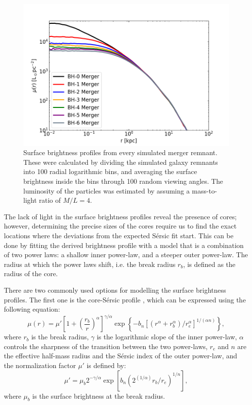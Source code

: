 \documentclass[english, oneside]{HYgradu}
\begin{document}
\begin{figure}[h]
	\centering
	\includegraphics[width=\textwidth]{SurfaceBrightnessProfiles.png}
	\caption{Surface brightness profiles from every simulated merger remnant. These were calculated by dividing the simulated galaxy remnants into 100 radial logarithmic bins, and averaging the surface brightness inside the bins through 100 random viewing angles. The luminosity of the particles was estimated by assuming a mass-to-light ratio of $M/L = 4$.}
	\label{figure:surface_brightness}
\end{figure}

The lack of light in the surface brightness profiles reveal the presence of cores; however, determining the precise sizes of the cores require us to find the exact locations where the deviations from the expected Sérsic fit start. This can be done by fitting the derived brightness profile with a model that is a combination of two power laws: a shallow inner power-law, and a steeper outer power-law. The radius at which the power laws shift, i.e. the break radius $r_b$, is defined as the radius of the core. 

There are two commonly used options for modelling the surface brightness profiles. The first one is the core-Sérsic profile \citep{Graham2003}, which can be expressed using the following equation:
\begin{equation}
\mu(r) = \mu' \left[ 1 + \left( \frac{r_b}{r} \right)^\alpha \right]^{\gamma / \alpha} \exp \left\lbrace -b_n \left[ \left( r^\alpha + r_b^\alpha \right) / r_e^\alpha \right]^{1/(\alpha n)} \right\rbrace, \label{eq:core-sersic}
\end{equation}
where $r_b$ is the break radius, $\gamma$ is the logarithmic slope of the inner power-law, $\alpha$ controls the sharpness of the transition between the two power-laws, $r_e$ and $n$ are the effective half-mass radius and the Sérsic index of the outer power-law, and the normalization factor $\mu'$ is defined by:
\begin{equation}
\mu' = \mu_b 2^{-\gamma/\alpha} \exp \left[ b_n \left( 2^{(1/\alpha)} r_b/r_e \right)^{1/n} \right], 
\label{eq:mu_dot}
\end{equation}
where $\mu_b$ is the surface brightness at the break radius. 
\end{document}
